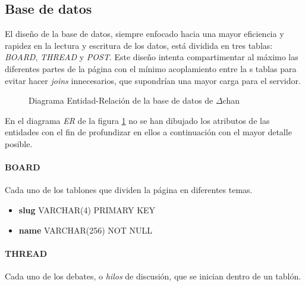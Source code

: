 \documentclass[12pt,a4paper,titlepage]{article}
\newcommand\projectname{$\Delta$chan}
\begin{document}
    \subsection{Base de datos}

    El diseño de la base de datos, siempre enfocado hacia una mayor eficiencia y rapidez en la lectura y escritura de los datos, está dividida en tres tablas: \textit{BOARD}, \textit{THREAD} y \textit{POST}. Este diseño intenta compartimentar al máximo las diferentes partes de la página con el mínimo acoplamiento entre la s tablas para evitar hacer \textit{joins} innecesarios, que supondrían una mayor carga para el servidor.

    \begin{figure}[ht]
        \centering
        \caption{Diagrama Entidad-Relación de la base de datos de \projectname}\bigskip
        \label{er:diagram}
    \end{figure}

    En el diagrama \emph{ER} de la figura \ref{er:diagram} no se han dibujado los atributos de las entidades con el fin de profundizar en ellos a continuación con el mayor detalle posible.

    \paragraph{BOARD} Cada uno de los tablones que dividen la página en diferentes temas.

    \begin{itemize}
        \item \textbf{slug} VARCHAR(4) PRIMARY KEY
        \item \textbf{name} VARCHAR(256) NOT NULL
    \end{itemize}

    \paragraph{THREAD} Cada uno de los debates, o \emph{hilos} de discusión, que se inician dentro de un tablón.
\end{document}
